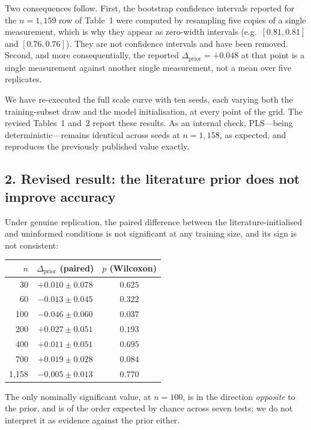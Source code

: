 Two consequences follow. First, the bootstrap confidence intervals reported
for the $n = 1{,}159$ row of Table~1 were computed by resampling five copies
of a single measurement, which is why they appear as zero-width intervals
(e.g.\ $[0.81, 0.81]$ and $[0.76, 0.76]$). They are not confidence intervals
and have been removed. Second, and more consequentially, the reported
$\Delta_{\text{prior}} = +0.048$ at that point is a single measurement
against another single measurement, not a mean over five replicates.

We have re-executed the full scale curve with ten seeds, each varying both
the training-subset draw and the model initialisation, at every point of the
grid. The revised Tables~1 and~2 report these results. As an internal check,
PLS---being deterministic---remains identical across seeds at
$n = 1{,}158$, as expected, and reproduces the previously published value
exactly.

\subsection*{2. Revised result: the literature prior does not improve accuracy}

Under genuine replication, the paired difference between the
literature-initialised and uninformed conditions is not significant at any
training size, and its sign is not consistent:

\begin{center}
\small
\begin{tabular}{rcc}
\hline
$n$ & $\Delta_{\text{prior}}$ (paired) & $p$ (Wilcoxon) \\
\hline
30      & $+0.010 \pm 0.078$ & $0.625$ \\
60      & $-0.013 \pm 0.045$ & $0.322$ \\
100     & $-0.046 \pm 0.060$ & $0.037$ \\
200     & $+0.027 \pm 0.051$ & $0.193$ \\
400     & $+0.011 \pm 0.051$ & $0.695$ \\
700     & $+0.019 \pm 0.028$ & $0.084$ \\
1{,}158 & $-0.005 \pm 0.013$ & $0.770$ \\
\hline
\end{tabular}
\end{center}

The only nominally significant value, at $n = 100$, is in the direction
\emph{opposite} to the prior, and is of the order expected by chance across
seven tests; we do not interpret it as evidence against the prior either.

